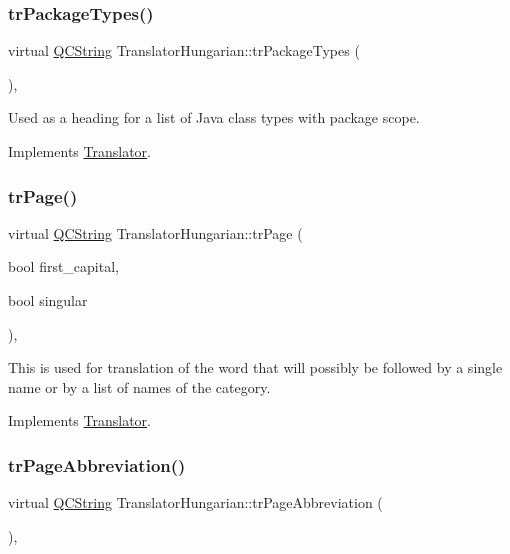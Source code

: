 \subsubsection{\texorpdfstring{trPackageTypes()}{trPackageTypes()}}
{\footnotesize\ttfamily virtual \mbox{\hyperlink{class_q_c_string}{Q\+C\+String}} Translator\+Hungarian\+::tr\+Package\+Types (\begin{DoxyParamCaption}{ }\end{DoxyParamCaption})\hspace{0.3cm}{\ttfamily [inline]}, {\ttfamily [virtual]}}

Used as a heading for a list of Java class types with package scope. 

Implements \mbox{\hyperlink{class_translator}{Translator}}.

\mbox{\label{class_translator_hungarian_abca7c2bdd235288864bf7ab1cb33dfdb}} 
\subsubsection{\texorpdfstring{trPage()}{trPage()}}
{\footnotesize\ttfamily virtual \mbox{\hyperlink{class_q_c_string}{Q\+C\+String}} Translator\+Hungarian\+::tr\+Page (\begin{DoxyParamCaption}\item[{bool}]{first\+\_\+capital,  }\item[{bool}]{singular }\end{DoxyParamCaption})\hspace{0.3cm}{\ttfamily [inline]}, {\ttfamily [virtual]}}

This is used for translation of the word that will possibly be followed by a single name or by a list of names of the category. 

Implements \mbox{\hyperlink{class_translator}{Translator}}.

\mbox{\label{class_translator_hungarian_ae92a34ce85d55c256e66d6ef3ac74ee1}} 
\subsubsection{\texorpdfstring{trPageAbbreviation()}{trPageAbbreviation()}}
{\footnotesize\ttfamily virtual \mbox{\hyperlink{class_q_c_string}{Q\+C\+String}} Translator\+Hungarian\+::tr\+Page\+Abbreviation (\begin{DoxyParamCaption}{ }\end{DoxyParamCaption})\hspace{0.3cm}{\ttfamily [inline]}, {\ttfamily [virtual]}}


